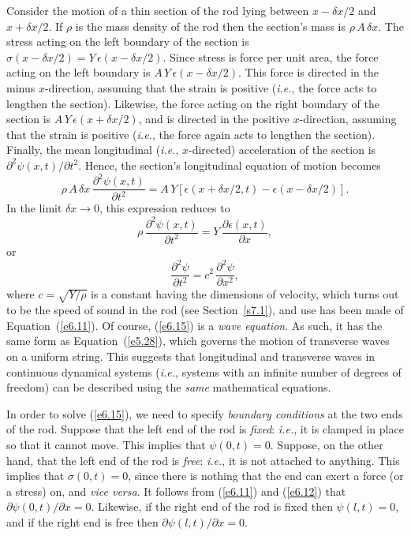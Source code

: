 Consider the motion of a thin section of the rod lying between $x-\delta x/2$ and $x+\delta x/2$. If $\rho$ is the mass density of the rod then the  section's mass
is $\rho\,A\,\delta x$. The stress acting on the left boundary of the section
is $\sigma(x-\delta x/2) = Y\,\epsilon(x-\delta x/2)$. Since stress is force per
unit area, the force acting on the left boundary is $A\,Y\,\epsilon(x-\delta x/2)$.
This force is directed in the minus $x$-direction, assuming that the strain is positive ({\em i.e.}, the force acts to lengthen the section). Likewise, the force acting
on the right boundary of the section is $A\,Y\,\epsilon(x+\delta x/2)$, and
is directed in the positive $x$-direction, assuming that the strain is positive ({\em i.e.}, the force again acts to lengthen the section). Finally, the mean longitudinal ({\em i.e.}, $x$-directed) acceleration of the
section is $\partial^2\psi(x,t)/\partial t^2$. Hence, the section's longitudinal equation of motion
 becomes
\begin{equation}
\rho\,A\,\delta x\,\frac{\partial^2\psi(x,t)}{\partial t^2} = A\,Y\left[\epsilon(x+\delta x/2,t)-\epsilon(x-\delta x/2)\right].
\end{equation}
In the limit $\delta x\rightarrow 0$, this expression reduces to
\begin{equation}
\rho\,\frac{\partial^2\psi(x,t)}{\partial t^2} = Y\,\frac{\partial\epsilon(x,t)}{\partial x},
\end{equation}
or
\begin{equation}\label{e6.15}
\frac{\partial^2\psi}{\partial t^2} = c^2\,\frac{\partial^2\psi}{\partial x^2},
\end{equation}
where $c=\sqrt{Y/\rho}$ is a constant having the dimensions of velocity, which turns
out to be the speed of sound in the rod (see Section~\ref{s7.1}), and
use has been made of Equation~(\ref{e6.11}). Of course, (\ref{e6.15}) is a
{\em wave equation}. As such, it has  the same form as Equation~(\ref{e5.28}), which
governs the motion of transverse waves on a uniform string. This suggests that
longitudinal and transverse waves in  continuous dynamical systems ({\em i.e.}, systems with an infinite number of degrees of freedom) can be described using the {\em same}\/ mathematical
equations. 

In order to solve (\ref{e6.15}), we need to specify {\em boundary conditions}\/ at the
two ends of the rod. Suppose that the left end of the rod is {\em fixed}: {\em i.e.}, it
is clamped in place so that it
cannot move. This implies that $\psi(0,t)=0$. Suppose, on the other hand, that
the left end of the rod is {\em free}: {\em i.e.}, it is not attached to anything. 
This implies that $\sigma(0,t)=0$, since there is nothing that the end can exert a force (or a stress) on, and {\em vice versa}. It follows from (\ref{e6.11}) and (\ref{e6.12}) that
$\partial\psi(0,t)/\partial x=0$. Likewise, if the right end of the rod is
fixed then $\psi(l,t)=0$, and if the right end is free then $\partial\psi(l,t)/\partial x=0$. 

